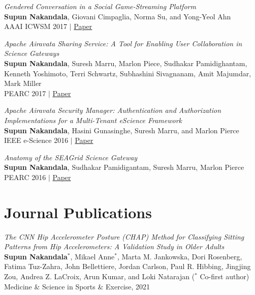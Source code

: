 \documentclass[margin]{res}
\begin{document}
\begin{resume}
\par
\textit{Gendered Conversation in a Social Game-Streaming Platform} \\
\textbf{Supun Nakandala}, Giovani Cimpaglia, Norma Su, and Yong-Yeol Ahn \\
AAAI ICWSM 2017 $|$ \href{https://yongyeol.com/papers/nakandala2017twitch.pdf}{Paper}

\par
\textit{Apache Airavata Sharing Service: A Tool for Enabling User Collaboration in Science Gateways} \\
\textbf{Supun Nakandala}, Suresh Marru, Marlon Piece, Sudhakar Pamidighantam, Kenneth Yoshimoto, Terri Schwartz, Subhashini Sivagnanam, Amit Majumdar, Mark Miller\\
PEARC 2017 $|$ \href{https://dl.acm.org/doi/10.1145/3093338.3093359}{Paper}

\par
\textit{Apache Airavata Security Manager: Authentication and Authorization Implementations for a Multi-Tenant eScience Framework} \\
\textbf{Supun Nakandala}, Hasini Gunasinghe, Suresh Marru, and Marlon Pierce\\
IEEE e-Science 2016 $|$ \href{https://scholarworks.iu.edu/dspace/bitstream/handle/2022/21092/airavata-security-escience16.pdf;jsessionid=58FF59D4EDF8DA7C45FB89F78B187A3C?sequence=1}{Paper}

\par
\textit{Anatomy of the SEAGrid Science Gateway} \\
\textbf{Supun Nakandala}, Sudhakar Pamidigantam, Suresh Marru, Marlon Pierce\\
PEARC 2016 $|$ \href{https://dl.acm.org/doi/pdf/10.1145/2949550.2949591}{Paper}


\section{Journal Publications}
\par
\textit{The CNN Hip Accelerometer Posture (CHAP) Method for Classifying Sitting Patterns from Hip Accelerometers: A Validation Study in Older Adults} \\
\textbf{Supun Nakandala}$^*$, Mikael Anne$^*$, Marta M. Jankowska, Dori Rosenberg, Fatima Tuz-Zahra, John Bellettiere, Jordan Carlson, Paul R. Hibbing, Jingjing Zou, Andrea Z. LaCroix, Arun Kumar, and Loki Natarajan ($^*$ Co-first author)\\
Medicine \& Science in Sports \& Exercise, 2021


\end{resume}
\end{document}
